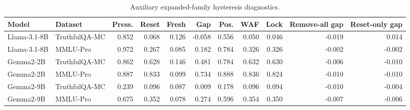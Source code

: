 \begin{table}[ht]
\centering
\caption{Auxiliary expanded-family hysteresis diagnostics.}
\label{tab:auxiliary-expanded-family}
\begin{tabular}{llrrrrrrrrr}
\toprule
Model & Dataset & Press. & Reset & Fresh & Gap & Pos. & WAF & Lock & Remove-all gap & Reset-only gap \\
\midrule
Llama-3.1-8B & TruthfulQA-MC & 0.852 & 0.068 & 0.126 & -0.058 & 0.556 & 0.050 & 0.046 & -0.019 & 0.014 \\
Llama-3.1-8B & MMLU-Pro & 0.972 & 0.267 & 0.085 & 0.182 & 0.784 & 0.326 & 0.326 & -0.002 & -0.002 \\
Gemma2-2B & TruthfulQA-MC & 0.862 & 0.628 & 0.146 & 0.481 & 0.784 & 0.632 & 0.630 & -0.006 & -0.010 \\
Gemma2-2B & MMLU-Pro & 0.887 & 0.833 & 0.099 & 0.734 & 0.888 & 0.836 & 0.824 & -0.010 & -0.010 \\
Gemma2-9B & TruthfulQA-MC & 0.239 & 0.096 & 0.087 & 0.009 & 0.178 & 0.096 & 0.094 & -0.010 & -0.004 \\
Gemma2-9B & MMLU-Pro & 0.675 & 0.352 & 0.078 & 0.274 & 0.596 & 0.354 & 0.350 & -0.007 & -0.006 \\
\bottomrule
\end{tabular}
\end{table}
